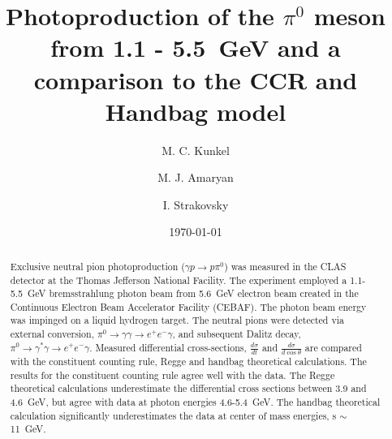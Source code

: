 \documentclass[%
reprint,
showpacs,
preprintnumbers,
amsmath,amssymb,
aps,
]{revtex4-1}
\begin{document}


\title{Photoproduction of the $\pi^0$ meson from 1.1 - 5.5~GeV and a comparison to the CCR and Handbag model}
\author{M. C. Kunkel}
\author{M. J. Amaryan}%
\author{I. Strakovsky}%
\date{\today}%

\begin{abstract}
Exclusive neutral pion photoproduction ($\gamma p \rightarrow p \pi^0$) was measured in the CLAS detector at the Thomas Jefferson National Facility. The experiment employed a 1.1-5.5~GeV bremsstrahlung photon beam from 5.6~GeV electron beam created in the Continuous Electron Beam Accelerator Facility (CEBAF). The photon beam energy was impinged on a liquid hydrogen target. The neutral pions were detected via external conversion, $\pi^0 \rightarrow \gamma \gamma \rightarrow e^+e^-\gamma$, and subsequent Dalitz decay, $\pi^0 \rightarrow \gamma^* \gamma \rightarrow e^+e^-\gamma$. Measured differential cross-sections, $\frac{d\sigma}{dt}$ and $\frac{d\sigma}{d\cos \theta}$ are compared with the constituent counting rule, Regge and handbag theoretical calculations. The results for the constituent counting rule agree well with the data. The Regge theoretical calculations underestimate the differential cross sections between 3.9 and 4.6~GeV, but agree with data at photon energies 4.6-5.4~GeV. The handbag theoretical calculation significantly underestimates the data at center of mass energies, s  $\sim$ 11~GeV.  
\end{abstract}
%
\maketitle
%






%

%
\nocite{*}
%
%
\end{document}
